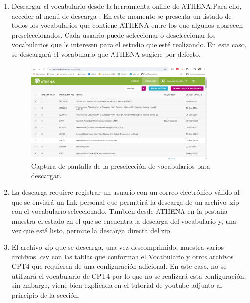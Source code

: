 \begin{enumerate}

    \item Descargar el vocabulario desde la herramienta online de  ATHENA.Para ello, acceder al menú de descarga . En este momento se presenta un listado de todos los vocabularios que contiene ATHENA entre los que algunos aparecen preseleccionados. Cada usuario puede seleccionar o deseleccionar los vocabularios que le interesen para el estudio que esté realizando. En este caso, se descargará el vocabulario que ATHENA sugiere por defecto.
    
    \begin{figure}[H]
        \centering
        \includegraphics[width=0.90\textwidth]{figures/athenaPreDownload.png}
        \caption{Captura de pantalla de la preselección de vocabularios para descargar.}
        \label{fig:athenaPreDownload}
    \end{figure}

    \item La descarga requiere registrar un usuario con un correo electrónico válido al que se enviará un link personal que permitirá la descarga de un archivo .zip con el vocabulario seleccionado. También desde ATHENA en la pestaña  muestra el estado en el que se encuentra la descarga del vocabulario y, una vez que esté listo, permite la descarga directa del zip.

    \item El archivo zip que se descarga, una vez descomprimido, muestra varios archivos .csv con las tablas que conforman el Vocabulario y otros archivos CPT4 que requieren de una configuración adicional. En este caso, no se utilizará el vocabulario de CPT4 por lo que no se realizará esta configuración, sin embargo, viene bien explicada en el tutorial de youtube adjunto al principio de la sección.


\end{enumerate}
